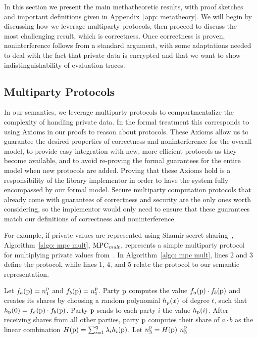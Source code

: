 

In this section we present the main methatheoretic results, 
with proof sketches and important definitions given in Appendix~\ref{app: metatheory}.
We will begin by discussing how we leverage multiparty protocols, then proceed to discuss 
the most challenging result, which is correctness. 
Once correctness is proven, noninterference follows from a standard argument, with some adaptations needed to deal with the fact that private data is encrypted and 
that we want to show indistinguishability of evaluation traces. 



\subsection{Multiparty Protocols}
In our semantics, we leverage multiparty protocols to compartmentalize
the complexity of handling private data. In the formal treatment this
corresponds to using Axioms in our proofs to reason about
protocols. These Axioms allow us to guarantee the desired properties
of correctness and noninterference for the overall model, to provide
easy integration with new, more efficient protocols as they become
available, and to avoid re-proving the formal guarantees for the
entire model when new protocols are added.  Proving that these Axioms
hold is a responsibility of the library implementor in order to have
the system fully encompassed by our formal model.  Secure
multiparty computation protocols that already come with guarantees
of correctness and security are the only ones worth considering, so the implementor would only need to
ensure that these guarantees match our definitions of correctness and
noninterference.


For example, if private values are represented using Shamir secret sharing~\cite{Shamir79}, Algorithm~\ref{algo: mpc mult}, $\mathrm{MPC}_\mathit{{mult}}$, represents
a simple multiparty protocol for multiplying
private values from~\cite{Gennaro98}.
In Algorithm~\ref{algo: mpc mult}, lines 2 and
3 define the protocol, while lines 1, 4, and 5 relate the
protocol to our semantic representation.

\begin{algorithm*}\footnotesize
\caption{$\n^\pid_3 \gets \MPC{mult}(\n^\pid_1, \n^\pid_2)$}
\label{algo: mpc mult}
\begin{algorithmic}[1]
	\STATE Let $f_a(\mathrm{{p}}) = n^{\mathrm{{p}}}_1$ and $f_b(\mathrm{{p}}) = n^{\mathrm{{p}}}_1$.
	\STATE Party $\mathrm{{p}}$ computes the value $f_a(\mathrm{{p}}) \cdot f_b(\mathrm{{p}})$ and creates its shares by choosing a random polynomial $h_{\mathrm{{p}}}(x)$ of degree $t$, such that $h_{\mathrm{{p}}}(0)=f_a(\mathrm{{p}}) \cdot f_b(\mathrm{{p}})$. Party $\mathrm{{p}}$ sends to each party $i$ the value $h_{\mathrm{{p}}}(i)$. 
	\STATE After receiving shares from all other parties, party $\mathrm{{p}}$ computes their share of $a \cdot b$ as the linear combination $H(\mathrm{{p}}) = \sum^{\mathrm{{q}}}_{i=1} \lambda_i h_i(\mathrm{{p}})$.
	\STATE Let $n^{\mathrm{{p}}}_3 = H(\mathrm{{p}})$
	\RETURN $n^{\mathrm{{p}}}_3$
\end{algorithmic}
\end{algorithm*}

